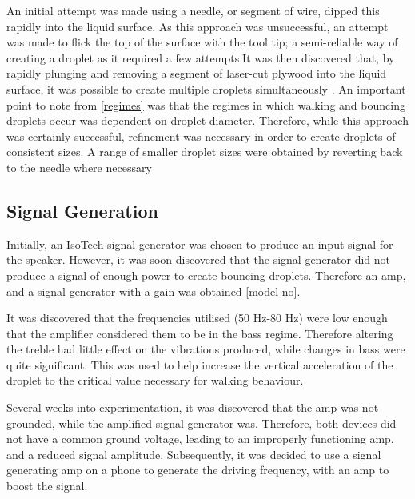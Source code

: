 An initial attempt was made using a needle, or segment of wire,  dipped this rapidly into the liquid surface. As this approach was unsuccessful,  an attempt was made to flick the top of the surface with the tool tip; a semi-reliable way of creating a droplet as it required a few attempts.It was then discovered that, by rapidly plunging and  removing a segment of laser-cut plywood into the liquid surface, it was possible to create multiple droplets simultaneously . An important point to note from \ref{regimes} was that the regimes in which walking and bouncing droplets occur was dependent on droplet diameter. Therefore, while this approach was certainly successful, refinement was necessary in order to create droplets of consistent sizes. A range of smaller droplet sizes were obtained by reverting back to the needle where necessary

\subsection{Signal Generation}
Initially, an IsoTech  signal generator was chosen to produce an input signal for the speaker. However, it was soon discovered that the signal generator did not produce a signal of enough power to create bouncing droplets. Therefore an amp, and a signal generator with a gain was obtained  [model no]. 

It was discovered that  the frequencies utilised (50 Hz-80 Hz) were low enough that the amplifier considered them to be in the bass regime. Therefore altering the treble had little effect on the vibrations produced, while changes in bass were quite significant. This was used to help increase the vertical acceleration of the droplet to the critical value necessary for walking behaviour. 

Several weeks into experimentation, it was discovered that the amp was not grounded, while the amplified signal generator was. Therefore, both devices did not have a common ground voltage, leading to an improperly functioning amp, and a reduced signal amplitude. Subsequently, it was decided to use a signal generating amp on a phone to generate the driving frequency, with an amp to boost the signal.  

